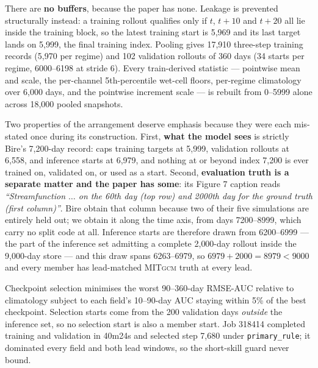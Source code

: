 \documentclass[11pt]{article}
\newcommand{\MITgcm}{\textsc{MITgcm}}
\begin{document}
There are \textbf{no buffers}, because the paper has none.  Leakage is prevented
structurally instead: a training rollout qualifies only if \(t\), \(t+10\) and
\(t+20\) all lie inside the training block, so the latest training start is
5{,}969 and its last target lands on 5{,}999, the final training index.  Pooling
gives 17{,}910 three-step training records (5{,}970 per regime) and 102 validation
rollouts of 360 days (34 starts per regime, 6000--6198 at stride 6).  Every
train-derived statistic --- pointwise mean and scale, the per-channel
5th-percentile wet-cell floors, per-regime climatology over 6{,}000 days, and the
pointwise increment scale --- is rebuilt from 0--5999 alone across 18{,}000 pooled
snapshots.

Two properties of the arrangement deserve emphasis because they were each
mis-stated once during its construction.  First, \textbf{what the model sees} is
strictly Bire's 7{,}200-day record:  caps training
targets at 5{,}999, validation rollouts at 6{,}558, and inference starts at 6{,}979,
and nothing at or beyond index 7{,}200 is ever trained on, validated on, or used
as a start.  Second, \textbf{evaluation truth is a separate matter and the paper
has some}: its Figure 7 caption reads \emph{``Streamfunction \(\ldots\) on the
60th day (top row) and 2000th day for the ground truth (first column)''}.  Bire
obtain that column because two of their five simulations are entirely held out;
we obtain it along the time axis, from days 7200--8999, which carry no split code
at all.  Inference starts are therefore drawn from 6200--6999 --- the part of the
inference set admitting a complete 2{,}000-day rollout inside the 9{,}000-day store
--- and this draw spans 6263--6979, so \(6979+2000=8979<9000\) and every member
has lead-matched \MITgcm{} truth at every lead.

Checkpoint selection minimises the worst 90--360-day RMSE-AUC relative to
climatology subject to each field's 10--90-day AUC staying within 5\% of the
best checkpoint.  Selection starts come from the 200 validation days
\emph{outside} the inference set, so no selection start is also a member start.
Job 318414 completed training and validation in 40m24s and selected step 7{,}680
under \texttt{primary\_rule}; it dominated every field and both lead windows, so
the short-skill guard never bound.
\end{document}
